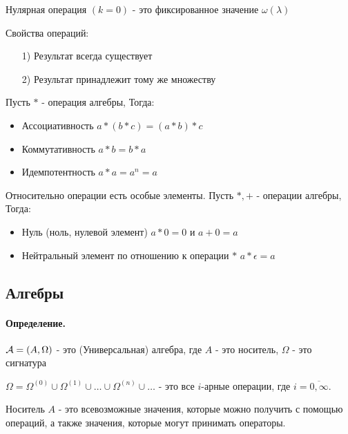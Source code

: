 \documentclass{report}
\begin{document}
Нулярная операция $(k = 0)$ - это фиксированное значение $\omega(\lambda)$

\medskip

Свойства операций:
\begin{itemize}
	\item[1)] Результат всегда существует
	\item[2)] Результат принадлежит тому же множеству
\end{itemize}

\medskip

Пусть $*$ - операция алгебры, Тогда:
\begin{itemize}
	\item Ассоциативность\newline
	      $a * (b * c) = (a * b) * c$
	\item Коммутативность\newline
	      $a*b = b*a$
	\item Идемпотентность\newline
	      $a*a = a^{n} = a$
\end{itemize}

Относительно операции есть особые элементы. Пусть $*, +$ - операции алгебры, Тогда:
\begin{itemize}
	\item Нуль (ноль, нулевой элемент)\newline
	      $a*0 = 0$ и $a+0=a$
	\item Нейтральный элемент по отношению к операции $*$\newline
	      $a*\epsilon = a$
\end{itemize}

\subsection{Алгебры}
\paragraph*{Определение.}
${\cal A} = (A, \Omega)$ - это (Универсальная) алгебра, где $A$ - это носитель, $\Omega$ - это сигнатура

$\Omega = \Omega^{(0)} \cup \Omega^{(1)} \cup \ldots \cup \Omega^{(n)} \cup \ldots$
- это все $i$-арные операции, где $i = \overline{0,\infty}$.

\medskip

Носитель $A$ - это всевозможные значения, которые можно получить с помощью операций,
а также значения, которые могут принимать операторы.
\end{document}
